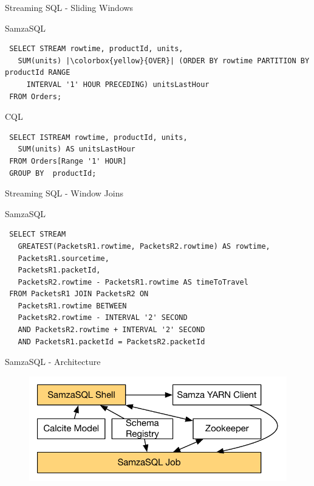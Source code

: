 \documentclass[newPxFont]{beamer}
\begin{document}
\begin{frame}[fragile]{Streaming SQL - Sliding Windows}

\begin{alertblock}{SamzaSQL}
 \begin{verbatim}
 SELECT STREAM rowtime, productId, units,
   SUM(units) |\colorbox{yellow}{OVER}| (ORDER BY rowtime PARTITION BY productId RANGE
     INTERVAL '1' HOUR PRECEDING) unitsLastHour 
 FROM Orders;
 \end{verbatim}
\end{alertblock}

\begin{exampleblock}{CQL}
 \begin{verbatim}
 SELECT ISTREAM rowtime, productId, units, 
   SUM(units) AS unitsLastHour
 FROM Orders[Range '1' HOUR]
 GROUP BY  productId;
 \end{verbatim}
\end{exampleblock}

\end{frame}


\begin{frame}[fragile]{Streaming SQL - Window Joins}

\begin{alertblock}{SamzaSQL}
 \begin{verbatim}
 SELECT STREAM
   GREATEST(PacketsR1.rowtime, PacketsR2.rowtime) AS rowtime,
   PacketsR1.sourcetime,
   PacketsR1.packetId,
   PacketsR2.rowtime - PacketsR1.rowtime AS timeToTravel
 FROM PacketsR1 JOIN PacketsR2 ON
   PacketsR1.rowtime BETWEEN
   PacketsR2.rowtime - INTERVAL '2' SECOND
   AND PacketsR2.rowtime + INTERVAL '2' SECOND
   AND PacketsR1.packetId = PacketsR2.packetId
 \end{verbatim}
\end{alertblock}

\end{frame}


\begin{frame}[c]{SamzaSQL - Architecture}
\begin{figure}
		\centering
		\includegraphics[width=0.9\linewidth]{samzasql-arch.pdf}
	\end{figure}
\end{frame}
\end{document}
